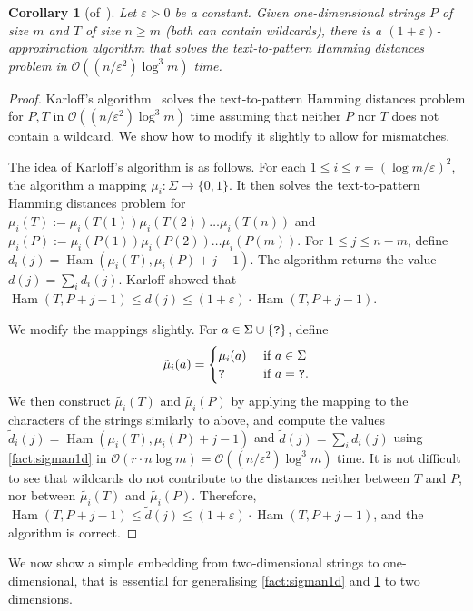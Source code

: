 \documentclass[11pt, letterpaper]{article}
\theoremstyle{plain}
\newtheorem{corollary}[fact]{Corollary}
\theoremstyle{definition}
\theoremstyle{remark}
\renewcommand{\O}{\mathcal{O}}
\DeclareMathOperator*{\Ham}{Ham}
\begin{document}
\begin{corollary}[of~\cite{Karloff1993}]\label{cor:approx1d}
Let $\varepsilon > 0$ be a constant. Given one-dimensional strings $P$ of size $m$ and $T$ of size $n \ge m$ (both can contain wildcards), there is a $(1+\varepsilon)$-approximation algorithm that solves the text-to-pattern Hamming distances problem in $\O((n/\varepsilon^2)  \log^3 m)$ time.
\end{corollary}
\begin{proof}
Karloff's algorithm~\cite{Karloff1993} solves the text-to-pattern Hamming distances problem for $P,T$ in $\O((n/\varepsilon^2)  \log^3 m)$ time assuming that neither $P$ nor $T$ does not contain a wildcard. We show how to modify it slightly to allow for mismatches. 

The idea of Karloff's algorithm is as follows. For each $1 \le i \le r = (\log m/ \varepsilon)^2$, the algorithm a mapping $\mu_i : \Sigma \rightarrow \{0,1\}$. It then solves the text-to-pattern Hamming distances problem for $\mu_i(T) := \mu_i(T(1))\mu_i(T(2)) \ldots \mu_i(T(n))$ and $\mu_i(P) := \mu_i(P(1))\mu_i(P(2)) \ldots \mu_i(P(m))$. For $1 \le j \le n-m$, define $d_i(j) = \Ham(\mu_i(T), \mu_i(P)+j-1)$. The algorithm returns the value $d(j) = \sum_i d_i(j)$. Karloff showed that $\Ham(T, P+j-1) \le d(j) \le (1+\varepsilon) \cdot \Ham(T, P+j-1)$.

We modify the mappings slightly. For $a \in \Sigma \cup \{\texttt{?}\}$, define
$$
\tilde{\mu}_i(a) = 
\begin{cases}
\mu_i(a) &\text{ if } a \in \Sigma\\
\texttt{?} & \text{ if } a = \texttt{?}.
\end{cases}
$$
We then construct $\tilde{\mu_i}(T)$ and $\tilde{\mu_i}(P)$ by applying the mapping to the characters of the strings similarly to above, and compute the values $\tilde{d}_i(j) = \Ham(\mu_i(T), \mu_i(P)+j-1)$ and $\tilde{d}(j) = \sum_i d_i(j)$ using \cref{fact:sigman1d} in $\O(r \cdot n \log m) = \O((n/\varepsilon^2) \log^3 m)$ time. It is not difficult to see that wildcards do not contribute to the distances neither between $T$ and $P$, nor between $\tilde{\mu_i}(T)$ and $\tilde{\mu_i}(P)$. Therefore, $\Ham(T, P+j-1) \le \tilde{d}(j) \le (1+\varepsilon) \cdot \Ham(T, P+j-1)$, and the algorithm is correct. 
\end{proof}

We now show a simple embedding from two-dimensional strings to one-dimensional, that is essential for generalising \cref{fact:sigman1d} and \cref{cor:approx1d} to two dimensions.
\end{document}
